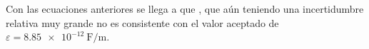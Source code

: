 \vspace{5mm}
Con las ecuaciones anteriores se llega a que , que
aún teniendo una incertidumbre relativa muy grande no es consistente con el
valor aceptado de $\varepsilon = \SI{8.85e-12}{\farad\per\meter}$.

